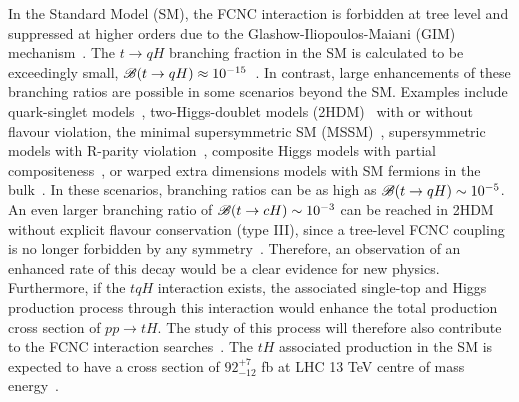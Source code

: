 \documentclass[PAPER, coverpage, atlasdraft=true, texlive=2016, UKenglish]{\ATLASLATEXPATH atlasdoc}
\begin{document}
In the Standard Model (SM), the FCNC interaction is forbidden at tree level and suppressed at higher orders due to the Glashow-Iliopoulos-Maiani (GIM) mechanism~\cite{Glashow:1970gm}. The $t\to qH$ branching fraction in the SM is calculated to be exceedingly small, $\mathscr{B}(t\to qH)\approx10^{-15}$~\cite{Eilam:1990zc,Mele:1998ag,AguilarSaavedra:2004wm,Zhang:2013xya}. 
In contrast, large enhancements of these branching ratios are possible in some scenarios beyond the SM.
Examples include quark-singlet models~\cite{AguilarSaavedra:2002kr}, two-Higgs-doublet models (2HDM)~\cite{Branco:2hdm2012} with or without flavour violation,
the minimal supersymmetric SM (MSSM)~\cite{Bejar:2000ub, Guasch:1999jp,Cao:2007dk,Cao:2014udj},
supersymmetric models with R-parity violation~\cite{Eilam:2001dh}, composite Higgs models with partial compositeness~\cite{Azatov:2014lha}, 
or warped extra dimensions models with SM fermions in the bulk~\cite{Azatov:2009na}. 
In these scenarios, branching ratios can be as high as $\mathscr{B}(t\to qH) \sim 10^{-5}$. 
An even larger branching ratio of  $\mathscr{B}(t\to cH) \sim 10^{-3}$ can be reached in 2HDM without explicit flavour conservation (type III),
since a tree-level FCNC coupling is no longer forbidden by any symmetry~\cite{Cheng:1987rs,Baum:2008qm,Chen:2013qta,Chiang:2015cba,Crivellin:2015hha,Botella:2015hoa, Gori:2017tvg,Chiang:2017fjr}. 
Therefore, an observation of an enhanced rate of this decay would be a clear evidence for new physics.
Furthermore, if the $tqH$ interaction exists, the associated single-top and  Higgs  production process through this interaction would enhance 
the total
production cross section of $pp\rightarrow tH$.
The study of this process will therefore also contribute to the FCNC interaction searches~\cite{Greljo:2014dka}.
The $tH$ associated production in the SM is expected to have a cross section of $92^{+7}_{-12}$ fb at LHC 13 TeV centre of mass energy~\cite{deFlorian:2016spz}.
\end{document}
